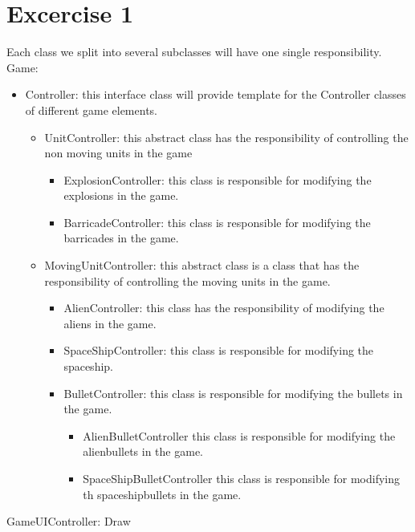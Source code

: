 \documentclass[10pt]{article}
\begin{document}
\section*{Excercise 1}
Each class we split into several subclasses will have one single responsibility. \\
Game:
\begin{itemize}
\item Controller: this interface class will provide template for the Controller classes of different game elements. 
\begin{itemize}
\item UnitController: this abstract class has the responsibility of controlling the non moving units in the game
\begin{itemize}
\item ExplosionController: this class is responsible for modifying the explosions in the game.
\item BarricadeController: this class is responsible for modifying the barricades in the game.
\end{itemize}
\item MovingUnitController: this abstract class is a class that has the responsibility of controlling the moving units in the game. 
\begin{itemize}
	\item AlienController: this class has the responsibility of modifying the aliens in the game.
	\item SpaceShipController: this class is responsible for modifying the spaceship.
	\item BulletController: this class is responsible for modifying the bullets in the game.
	\begin{itemize}
		\item AlienBulletController this class is responsible for modifying the alienbullets in the game.
		\item SpaceShipBulletController this class is responsible for modifying th spaceshipbullets in the game.
	\end{itemize}
\end{itemize}
\end{itemize}
\end{itemize}
GameUIController: \newline
Draw
\end{document}
